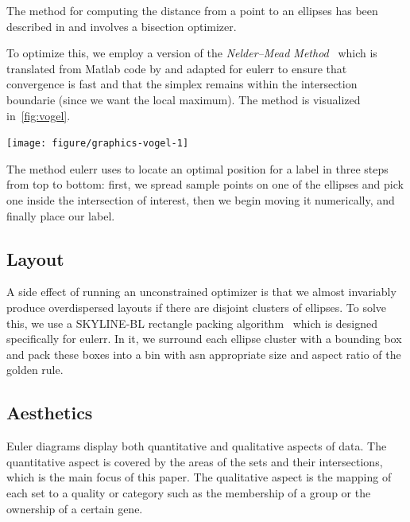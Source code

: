 \documentclass[
  a4paper,
  nofonts,
  nobib,
  titlepage,
  justified,
  marginals=raggedouter,
  nohyper
]{tufte-handout}\usepackage[]{graphicx}\usepackage[]{color}
\newenvironment{knitrout}{}{} %
\newcommand{\pkg}[1]{{\fontseries{b}\selectfont #1}}
\begin{document}
The method for computing the distance from a point to an ellipses has
been described in \citet{eberly_x} and involves a bisection optimizer.

To optimize this, we employ a version of the
\emph{Nelder--Mead Method}~\citep{nelder_1965} which is translated from Matlab
code by \citet{kelley_1999} and adapted for \pkg{eulerr} to ensure that
convergence is fast and that
the simplex remains within the intersection boundarie (since we want
the local maximum). The method is visualized in~\cref{fig:vogel}.
\begin{marginfigure}
\begin{knitrout}
\color{fgcolor}

{\centering \texttt{[image: figure/graphics-vogel-1]} 

}



\end{knitrout}
\caption{The method eulerr uses to locate an optimal position for a label in three steps from top to bottom: first, we spread sample points on one of the ellipses and pick one inside the intersection of interest, then we begin moving it numerically, and finally place our label.}
\label{fig:vogel}
\end{marginfigure}

\subsection{Layout}
\label{sec:layout}

A side effect of running an unconstrained optimizer is that we almost invariably
produce overdispersed layouts if there are disjoint clusters of ellipses. To
solve this, we use a SKYLINE-BL rectangle packing algorithm~\citep{jylanki_2010}
which is designed specifically for \pkg{eulerr}. In it, we surround each
ellipse cluster with a bounding box and pack these boxes into a bin with asn
appropriate size and aspect ratio of the golden rule.

\subsection{Aesthetics}
\label{sec:aesthetics}

Euler diagrams display both quantitative and qualitative aspects of data.
The quantitative aspect is covered by the areas of the sets and their
intersections, which is the main focus of this paper. The qualitative aspect
is the mapping of each set to a quality or category such as the membership of a
group or the ownership of a certain gene.
\end{document}
